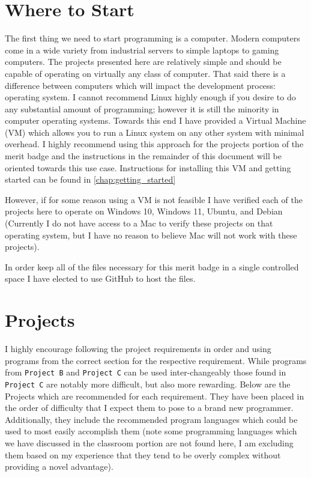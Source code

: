   \section{Where to Start}
  \label{sec:where_to_start}

    The first thing we need to start programming is a computer.
    Modern computers come in a wide variety from industrial servers to simple laptops to gaming computers.
    The projects presented here are relatively simple and should be capable of operating on virtually
      any class of computer.
    That said there is a difference between computers which will impact the development process: operating system.
    I cannot recommend Linux highly enough if you desire to do any substantial amount of programming;
      however it is still the minority in computer operating systems.
    Towards this end I have provided a Virtual Machine (VM) which allows you to run a Linux system on any other system
      with minimal overhead.
    I highly recommend using this approach for the projects portion of the merit badge and the instructions in the 
      remainder of this document will be oriented towards this use case.
    Instructions for installing this VM and getting started can be found in \autoref{chap:getting_started}

    However, if for some reason using a VM is not feasible I have verified each of the projects here to operate on 
      Windows 10, Windows 11, Ubuntu, and Debian (Currently I do not have access to a Mac to verify these projects 
      on that operating system, but I have no reason to believe Mac will not work with these projects).

    In order keep all of the files necessary for this merit badge in a single controlled space
      I have elected to use GitHub to host the files.


  \section{Projects}
  \label{sec:projects}

    I highly encourage following the project requirements in order and using programs from the correct section
      for the respective requirement.
    While programs from \texttt{Project B} and \texttt{Project C} can be used inter-changeably those found in 
      \texttt{Project C} are notably more difficult, but also more rewarding.
    Below are the Projects which are recommended for each requirement.
    They have been placed in the order of difficulty that I expect them to pose to a brand new programmer.
    Additionally, they include the recommended program languages which could be used to most easily accomplish them
      (note some programming languages which we have discussed in the classroom portion are not found here, 
      I am excluding them based on my experience that they tend to be overly complex without providing a novel advantage).

